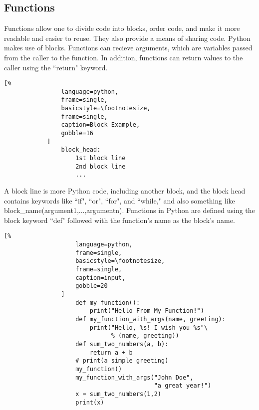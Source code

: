 \documentclass[crop=false,class=book]{standalone}
\begin{document}
        \subsection{Functions}
            Functions allow one to divide code into blocks, order
            code, and make it more readable and easier to reuse. They
            also provide a means of sharing code. Python makes use of
            blocks. Functions can recieve arguments, which are
            variables passed from the caller to the function. In
            addition, functions can return values to the caller using
            the ``return" keyword.
            \begin{lstlisting}[%
                language=python,
                frame=single,
                basicstyle=\footnotesize,
                frame=single,
                caption=Block Example,
                gobble=16
            ]
                block_head:
                    1st block line
                    2nd block line
                    ...
            \end{lstlisting}
            A block line is more Python code, including another
            block, and the block head contains keywords like ``if",
            ``or", ``for", and ``while," and also something like
            block\_name(argument1,...,argumentn). Functions in Python
            are defined using the block keyword ``def" followed with
            the function's name as the block's name.\newline
            \begin{minipage}[t]{.48\textwidth}
                \centering
                \begin{lstlisting}[%
                    language=python,
                    frame=single,
                    basicstyle=\footnotesize,
                    frame=single,
                    caption=input,
                    gobble=20
                ]
                    def my_function():
                        print("Hello From My Function!")
                    def my_function_with_args(name, greeting):
                        print("Hello, %s! I wish you %s"\
                              % (name, greeting))
                    def sum_two_numbers(a, b):
                        return a + b
                    # print(a simple greeting)
                    my_function()
                    my_function_with_args("John Doe",
                                          "a great year!")
                    x = sum_two_numbers(1,2)
                    print(x)
                \end{lstlisting}
            \end{minipage}\hfill
\end{document}
